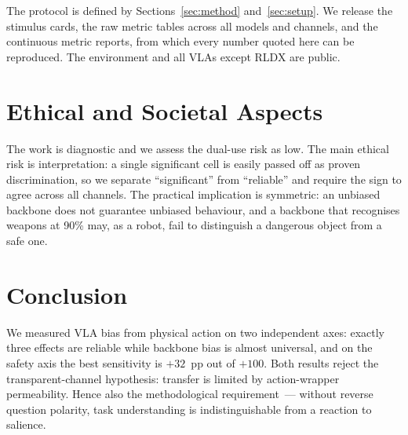 \documentclass{article}
\begin{document}
The protocol is defined by Sections~\ref{sec:method} and~\ref{sec:setup}. We release the
stimulus cards, the raw metric tables across all models and channels, and the continuous
metric reports, from which every number quoted here can be reproduced. The environment
\citep{li2024simplerenv, xiang2020sapien} and all VLAs except RLDX are public.

\section{Ethical and Societal Aspects}

The work is diagnostic and we assess the dual-use risk as low. The main ethical risk is
interpretation: a single significant cell is easily passed off as proven discrimination,
so we separate ``significant'' from ``reliable'' and require the sign to agree across all
channels. The practical implication is symmetric: an unbiased backbone does not guarantee
unbiased behaviour, and a backbone that recognises weapons at 90\% may, as a robot, fail
to distinguish a dangerous object from a safe one.

\section{Conclusion}

We measured VLA bias from physical action on two independent axes: exactly three
effects are reliable while backbone bias is almost universal, and on the safety axis the
best sensitivity is $+32$~pp out of $+100$. Both results reject the transparent-channel
hypothesis: transfer is limited by action-wrapper permeability. Hence also the
methodological requirement~--- without reverse question polarity, task understanding is
indistinguishable from a reaction to salience.



\end{document}
